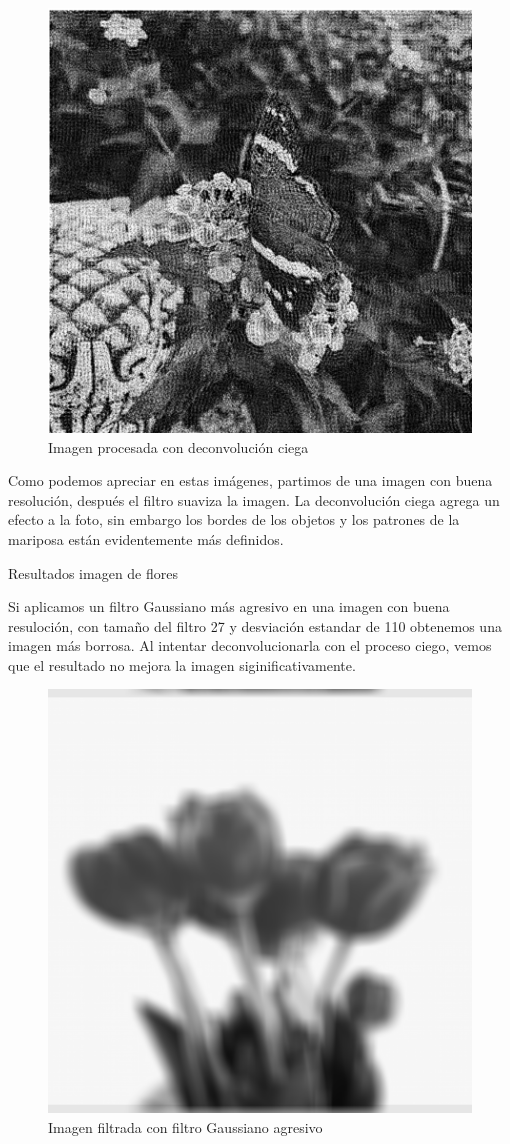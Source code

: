 \documentclass[eng]{ajceam-class}
\begin{document}
\begin{figure}[!h] 
 \centering
 \includegraphics[width=.7\columnwidth]{mariposa_deconv_ciega.png} 
 \caption{Imagen procesada con deconvolución ciega} \label{fig-1}
\end{figure}

Como podemos apreciar en estas imágenes, partimos de una imagen con buena resolución, después el filtro suaviza la imagen. La deconvolución ciega agrega un efecto a la foto, sin embargo los bordes de los objetos y los patrones de la mariposa están evidentemente más definidos. 


Resultados imagen de flores

Si aplicamos un filtro Gaussiano más agresivo en una imagen con buena resuloción, con tamaño del filtro 27 y desviación estandar de 110 obtenemos una imagen más borrosa. Al intentar deconvolucionarla con el proceso ciego, vemos que el resultado no mejora la imagen siginificativamente. 


\begin{figure}[!h] 
 \centering
 \includegraphics[width=.7\columnwidth]{flores_filtro.png} 
 \caption{Imagen filtrada con filtro Gaussiano agresivo} \label{fig-1}
\end{figure}
\end{document}
